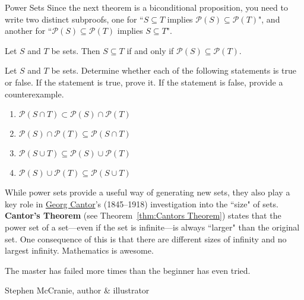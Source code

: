 \begin{section}{Power Sets}
Since the next theorem is a biconditional proposition, you need to write two distinct subproofs, one for ``$S\subseteq T$ implies $\mathcal{P}(S)\subseteq \mathcal{P}(T)$", and another for ``$\mathcal{P}(S)\subseteq \mathcal{P}(T)$ implies $S\subseteq T$".

\begin{theorem}
Let $S$ and $T$ be sets.  Then $S\subseteq T$ if and only if $\mathcal{P}(S)\subseteq \mathcal{P}(T)$.
\end{theorem}

\begin{problem}
Let $S$ and $T$ be sets. Determine whether each of the following statements is true or false. If the statement is true, prove it. If the statement is false, provide a counterexample.
\begin{enumerate}[label=\textrm{(\alph*)}]
\item $\mathcal{P}(S\cap T) \subset \mathcal{P}(S)\cap\mathcal{P}(T)$
\item $\mathcal{P}(S)\cap\mathcal{P}(T)\subseteq \mathcal{P}(S\cap T)$
\item $\mathcal{P}(S\cup T)\subseteq \mathcal{P}(S)\cup\mathcal{P}(T)$
\item $\mathcal{P}(S)\cup\mathcal{P}(T)\subseteq \mathcal{P}(S\cup T)$
\end{enumerate}
\end{problem}

While power sets provide a useful way of generating new sets, they also play a key role in \href{https://en.wikipedia.org/wiki/Georg_Cantor}{Georg Cantor}'s (1845--1918) investigation into the ``size" of sets. \textbf{Cantor's Theorem} (see Theorem~\ref{thm:Cantors Theorem}) states that the power set of a set---even if the set is infinite---is always ``larger" than the original set. One consequence of this is that there are different sizes of infinity and no largest infinity. Mathematics is awesome.

\epigraph{The master has failed more times than the beginner has even tried.}{Stephen McCranie, author \& illustrator}

\end{section}